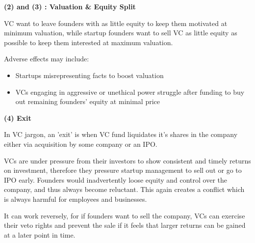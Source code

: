     \textbf{(2) and (3) : Valuation \& Equity Split}
    
    VC want to leave founders with as little equity to keep them motivated at minimum valuation, while startup founders want to sell VC as little equity as possible to keep them interested at maximum valuation.
    
    Adverse effects may include:
    \begin{itemize}
        \item Startups misrepresenting facts to boost valuation
        \item VCs engaging in aggressive or unethical power struggle after funding to buy out remaining founders' equity at minimal price
    \end{itemize}
    
    \textbf{(4) Exit}
    
    In VC jargon, an 'exit' is when VC fund liquidates it's shares in the company either via acquisition by some company or an IPO. 
    
    VCs are under pressure from their investors to show consistent and timely returns on investment, therefore they pressure startup management to sell out or go to IPO early. Founders would inadvertently loose equity and control over the company, and thus always become reluctant. This again creates a conflict which is always harmful for employees and businesses.
    
    It can work reversely, for if founders want to sell the company, VCs can exercise their veto rights and prevent the sale if it feels that larger returns can be gained at a later point in time.